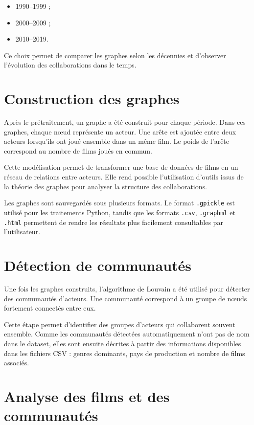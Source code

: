 \documentclass[11pt,a4paper,oneside,openany]{report}
\begin{document}
\begin{itemize}
    \item 1990--1999 ;
    \item 2000--2009 ;
    \item 2010--2019.
\end{itemize}

Ce choix permet de comparer les graphes selon les décennies et d’observer l’évolution des collaborations dans le temps.

\section{Construction des graphes}

Après le prétraitement, un graphe a été construit pour chaque période. Dans ces graphes, chaque nœud représente un acteur. Une arête est ajoutée entre deux acteurs lorsqu’ils ont joué ensemble dans un même film. Le poids de l’arête correspond au nombre de films joués en commun.

Cette modélisation permet de transformer une base de données de films en un réseau de relations entre acteurs. Elle rend possible l’utilisation d’outils issus de la théorie des graphes pour analyser la structure des collaborations.

Les graphes sont sauvegardés sous plusieurs formats. Le format \texttt{.gpickle} est utilisé pour les traitements Python, tandis que les formats \texttt{.csv}, \texttt{.graphml} et \texttt{.html} permettent de rendre les résultats plus facilement consultables par l’utilisateur.

\section{Détection de communautés}

Une fois les graphes construits, l’algorithme de Louvain a été utilisé pour détecter des communautés d’acteurs. Une communauté correspond à un groupe de nœuds fortement connectés entre eux.

Cette étape permet d’identifier des groupes d’acteurs qui collaborent souvent ensemble. Comme les communautés détectées automatiquement n’ont pas de nom dans le dataset, elles sont ensuite décrites à partir des informations disponibles dans les fichiers CSV : genres dominants, pays de production et nombre de films associés.

\section{Analyse des films et des communautés}
\end{document}
